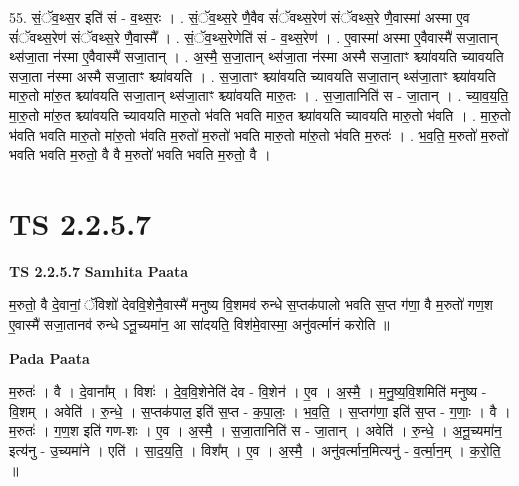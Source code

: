 \documentclass[17pt]{extarticle}
\begin{document}
55. सं॒ॅव॒थ्स॒र इति॑ सं - व॒थ्स॒रः । . सं॒ॅव॒थ्स॒रे णै॒वैव सं॑ॅवथ्स॒रेण॑ संॅवथ्स॒रे णै॒वास्मा॑ अस्मा ए॒व सं॑ॅवथ्स॒रेण॑ संॅवथ्स॒रे णै॒वास्मै᳚ । . सं॒ॅव॒थ्स॒रेणेति॑ सं - व॒थ्स॒रेण॑ । . ए॒वास्मा॑ अस्मा ए॒वैवास्मै॑ सजा॒तान् थ्स॑जा॒ता न॑स्मा ए॒वैवास्मै॑ सजा॒तान् । . अ॒स्मै॒ स॒जा॒तान् थ्स॑जा॒ता न॑स्मा अस्मै सजा॒ताꣳ श्च्या॑वयति च्यावयति सजा॒ता न॑स्मा अस्मै सजा॒ताꣳ
श्च्या॑वयति । . स॒जा॒ताꣳ श्च्या॑वयति च्यावयति सजा॒तान् थ्स॑जा॒ताꣳ श्च्या॑वयति मारु॒तो मा॑रु॒त श्च्या॑वयति सजा॒तान् थ्स॑जा॒ताꣳ श्च्या॑वयति मारु॒तः । . स॒जा॒तानिति॑ स - जा॒तान् । . च्या॒व॒य॒ति॒ मा॒रु॒तो मा॑रु॒त श्च्या॑वयति च्यावयति मारु॒तो भ॑वति भवति मारु॒त श्च्या॑वयति च्यावयति मारु॒तो भ॑वति । . मा॒रु॒तो भ॑वति भवति मारु॒तो मा॑रु॒तो भ॑वति म॒रुतो॑ म॒रुतो॑ भवति मारु॒तो मा॑रु॒तो भ॑वति म॒रुतः॑ । . भ॒व॒ति॒ म॒रुतो॑ म॒रुतो॑ भवति भवति म॒रुतो॒ वै वै म॒रुतो॑ भवति भवति म॒रुतो॒ वै । \newline
\pagebreak
{}

\section{ TS 2.2.5.7 }

\textbf{TS 2.2.5.7 } \newline
\textbf{Samhita Paata} \newline

म॒रुतो॒ वै दे॒वानां॒ ॅविशो॑ देववि॒शेनै॒वास्मै॑ मनुष्य वि॒शमव॑ रुन्धे स॒प्तक॑पालो भवति स॒प्त ग॑णा॒ वै म॒रुतो॑ गण॒श ए॒वास्मै॑ सजा॒तानव॑ रुन्धे ऽनू॒च्यमा॑न॒ आ सा॑दयति॒ विश॑मे॒वास्मा॒ अनु॑वर्त्मानं करोति ॥ \newline

\textbf{Pada Paata} \newline

म॒रुतः॑ । वै । दे॒वाना᳚म् । विशः॑ । दे॒व॒वि॒शेनेति॑ देव - वि॒शेन॑ । ए॒व । अ॒स्मै॒ । म॒नु॒ष्य॒वि॒शमिति॑ मनुष्य - वि॒शम् । अवेति॑ । रु॒न्धे॒ । स॒प्तक॑पाल॒ इति॑ स॒प्त - क॒पा॒लः॒ । भ॒व॒ति॒ । स॒प्तग॑णा॒ इति॑ स॒प्त - ग॒णाः॒ । वै । म॒रुतः॑ । ग॒ण॒श इति॑ गण-शः । ए॒व । अ॒स्मै॒ । स॒जा॒तानिति॑ स - जा॒तान् । अवेति॑ । रु॒न्धे॒ । अ॒नू॒च्यमा॑न॒ इत्य॑नु - उ॒च्यमा॑ने । एति॑ । सा॒द॒य॒ति॒ । विश᳚म् । ए॒व । अ॒स्मै॒ । अनु॑वर्त्मान॒मित्यनु॑ - व॒र्त्मा॒न॒म् । क॒रो॒ति॒ ॥  \newline
\end{document}
